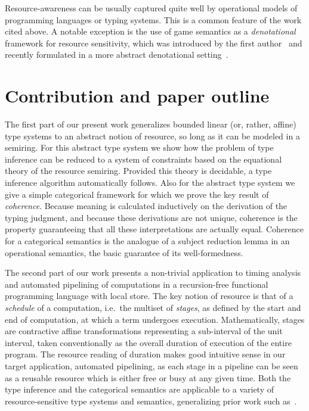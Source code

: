 \documentclass{article}
\begin{document}
Resource-awareness can be usually captured quite well by operational models of programming languages or typing systems. This is a common feature of the work cited above. A notable exception is the use of game semantics as a \emph{denotational} framework for resource sensitivity, which was introduced by the first author~\cite{DBLP:conf/popl/Ghica05} and recently formulated in a more abstract denotational setting~\cite{lairdmmp13}. 

\section{Contribution and paper outline}

The first part of our present work generalizes bounded linear (or, rather, affine) type systems to an abstract notion of resource, so long as it can be modeled in a semiring. For this abstract type system we show how the problem of type inference can be reduced to a system of constraints based on the equational theory of the resource semiring. Provided this theory is decidable, a type inference algorithm automatically follows. Also for the abstract type system we give a simple categorical framework for which we prove the key result of \emph{coherence}. Because meaning is calculated inductively on the derivation of the typing judgment, and because these derivations are not unique, coherence is the property guaranteeing that all these interpretations are actually equal. Coherence for a categorical semantics is the analogue of a subject reduction lemma in an operational semantics, the basic guarantee of its well-formedness. 

The second part of our work presents a non-trivial application to timing analysis and automated pipelining of computations in a recursion-free functional programming language with local store. The key notion of resource is that of a \emph{schedule} of a computation, i.e.\ the multiset of \emph{stages}, as defined by the start and end of computation, at which a term undergoes execution. Mathematically, stages are contractive affine transformations representing a sub-interval of the unit interval, taken conventionally as the overall duration of execution of the entire program. The resource reading of duration makes good intuitive sense in our target application, automated pipelining, as each stage in a pipeline can be seen as a reusable resource which is either free or busy at any given time. Both the type inference and the categorical semantics are applicable to a variety of resource-sensitive type systems and semantics, generalizing prior work such as~\cite{DBLP:conf/popl/GhicaS11}. 
\end{document}
